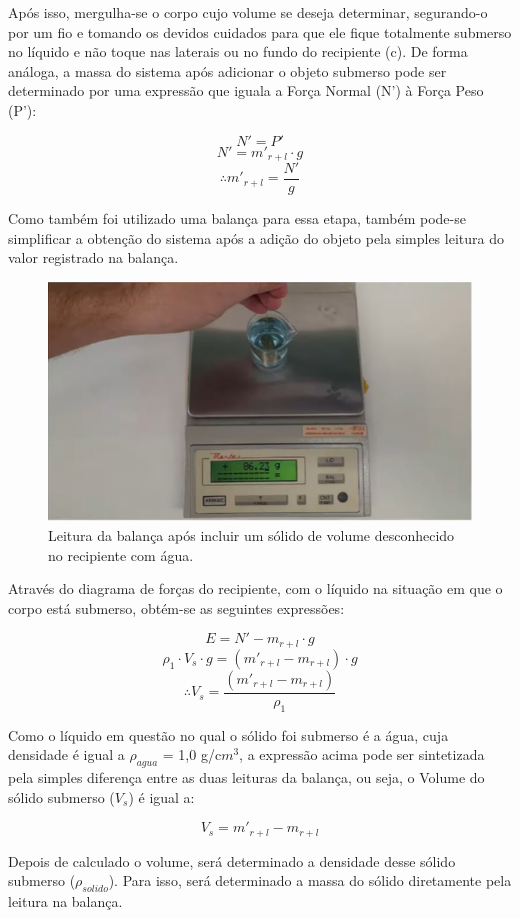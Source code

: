 Após isso, mergulha-se o corpo cujo volume se deseja determinar, segurando-o por um fio e tomando os devidos cuidados para que ele fique totalmente submerso no líquido e não toque nas laterais ou no fundo do recipiente (c). De forma análoga, a massa do sistema após adicionar o objeto submerso pode ser determinado por uma expressão que iguala a Força Normal (N’) à Força Peso (P’):

\[ N' = P' \]
\[ N' = m'_{r+l} \cdot g \]
\[\therefore m'_{r+l} = \frac{N'}{g} \]

Como também foi utilizado uma balança para essa etapa, também pode-se simplificar a obtenção do sistema após a adição do objeto pela simples leitura do valor registrado na balança.

\begin{figure}[H]
    \centering
    \includegraphics[scale=0.8]{images/Experimento2.1.png}
    \caption{Leitura da balança após incluir um sólido de volume desconhecido no recipiente com água.}
\end{figure}

Através do diagrama de forças do recipiente, com o líquido na situação em que o corpo está submerso, obtém-se as seguintes expressões:

\[ E = N' - m_{r+l} \cdot g \]
\[ \rho_1 \cdot V_s \cdot g = (m'_{r+l} - m_{r+l}) \cdot g \]
\[\therefore V_s = \frac{(m'_{r+l} - m_{r+l})}{\rho_1} \]

Como o líquido em questão no qual o sólido foi submerso é a água, cuja densidade é igual a $\rho_{agua}$ = 1,0 g/c$m^3$, a expressão acima pode ser sintetizada pela simples diferença entre as duas leituras da balança, ou seja, o Volume do sólido submerso ($V_s$) é igual a:

\[ V_s = m'_{r+l} - m_{r+l} \]

Depois de calculado o volume, será determinado a densidade desse sólido submerso ($\rho_{solido}$). Para isso, será determinado a massa do sólido diretamente pela leitura na balança. 

